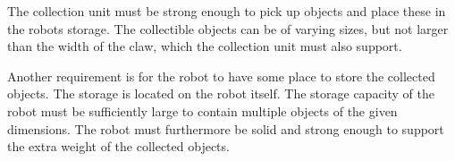 The collection unit must be strong enough to pick up objects and place these in the robots storage. The collectible objects can be of varying sizes, but not larger than the width of the claw, which the collection unit must also support.

Another requirement is for the robot to have some place to store the collected objects. The storage is located on the robot itself. The storage capacity of the robot must be sufficiently large to contain multiple objects of the given dimensions. The robot must furthermore be solid and strong enough to support the extra weight of the collected objects. 




